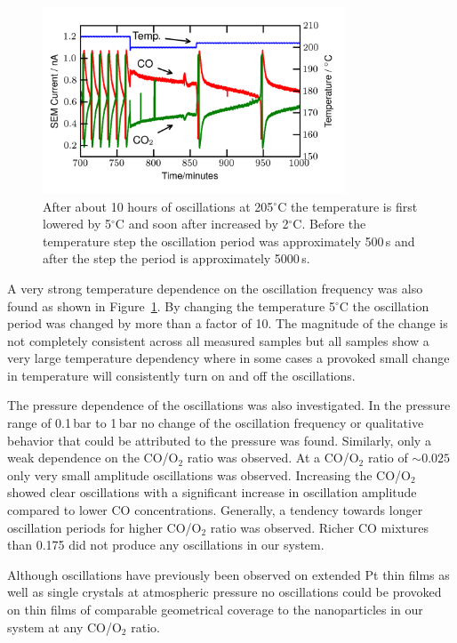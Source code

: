 \documentclass[8.5pt,twoside,twocolumn]{article}
\begin{document}
\begin{figure}[h]
\centering
  \includegraphics[width=9cm]{temperature_dependence.png}
  \caption{After about 10 hours of oscillations at 205$^\circ$C the temperature
  is first lowered by 5$^\circ$C and soon after increased by 2$^\circ$C. Before
  the temperature step the oscillation period was approximately 500\,s and
  after the step the period is approximately 5000\,s.}
  \label{fgr:temperature_dependence}
\end{figure}

A very strong temperature dependence on the oscillation frequency was also
found as shown in Figure~\ref{fgr:temperature_dependence}. By changing the
temperature 5$^\circ$C the oscillation period was changed by more than a factor
of 10. The magnitude of the change is not completely consistent across all
measured samples but all samples show a very large temperature dependency where
in some cases a provoked small change in temperature will consistently turn on
and off the oscillations.

The pressure dependence of the oscillations was also investigated. In the
pressure range of 0.1\,bar to 1\,bar no change of the oscillation frequency or
qualitative behavior that could be attributed to the pressure was found.
Similarly, only a weak dependence on the CO/O$_2$ ratio was observed. At a
CO/O$_2$ ratio of $\sim0.025$ only very small amplitude oscillations was
observed. Increasing the CO/O$_2$ showed clear oscillations with a significant
increase in oscillation amplitude compared to lower CO concentrations.
Generally, a tendency towards longer oscillation periods for higher CO/O$_2$
ratio was observed. Richer CO mixtures than 0.175 did not produce any
oscillations in our system.

Although oscillations have previously been observed on extended Pt thin films
\cite{Singh2010} as well as single crystals\cite{Hendriksen2005} at atmospheric
pressure no oscillations could be provoked on thin films of comparable
geometrical coverage to the nanoparticles in our system at any CO/O$_2$ ratio.
\end{document}
